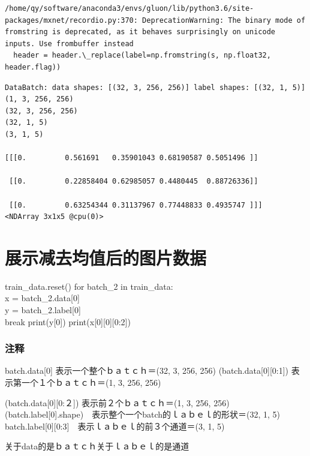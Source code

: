 \documentclass[11pt]{article}
\begin{document}
    \begin{Verbatim}[commandchars=\\\{\}]
/home/qy/software/anaconda3/envs/gluon/lib/python3.6/site-packages/mxnet/recordio.py:370: DeprecationWarning: The binary mode of fromstring is deprecated, as it behaves surprisingly on unicode inputs. Use frombuffer instead
  header = header.\_replace(label=np.fromstring(s, np.float32, header.flag))

    \end{Verbatim}

    \begin{Verbatim}[commandchars=\\\{\}]
DataBatch: data shapes: [(32, 3, 256, 256)] label shapes: [(32, 1, 5)]
(1, 3, 256, 256)
(32, 3, 256, 256)
(32, 1, 5)
(3, 1, 5)

[[[0.         0.561691   0.35901043 0.68190587 0.5051496 ]]

 [[0.         0.22858404 0.62985057 0.4480445  0.88726336]]

 [[0.         0.63254344 0.31137967 0.77448833 0.4935747 ]]]
<NDArray 3x1x5 @cpu(0)>

    \end{Verbatim}

    \section{展示减去均值后的图片数据}\label{ux5c55ux793aux51cfux53bbux5747ux503cux540eux7684ux56feux7247ux6570ux636e}

train\_data.reset() for batch\_2 in train\_data:\\
x = batch\_2.data{[}0{]}\\
y = batch\_2.label{[}0{]}\\
break print(y{[}0{]}) print(x{[}0{]}{[}0{]}{[}0:2{]})

\subsubsection{注释}\label{ux6ce8ux91ca}

batch.data{[}0{]} 表示一个整个ｂａｔｃｈ＝(32, 3, 256, 256)
(batch.data{[}0{]}{[}0:1{]}) 表示第一个１个ｂａｔｃｈ＝(1, 3, 256, 256)

(batch.data{[}0{]}{[}0:２{]}) 表示前２个ｂａｔｃｈ＝(1, 3, 256, 256)
(batch.label{[}0{]}.shape)　表示整个一个batch的ｌａｂｅｌ的形状＝(32, 1,
5) batch.label{[}0{]}{[}0:3{]}　表示ｌａｂｅｌ的前３个通道＝(3, 1, 5)

关于data的是ｂａｔｃｈ关于ｌａｂｅｌ的是通道
\end{document}
